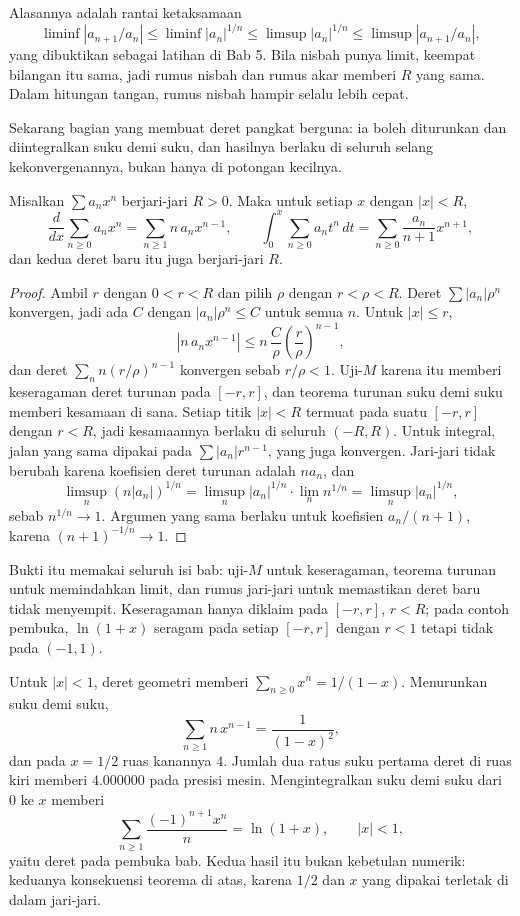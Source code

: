 Alasannya adalah rantai ketaksamaan
\[
  \liminf|a_{n+1}/a_n|\le\liminf|a_n|^{1/n}\le\limsup|a_n|^{1/n}
  \le\limsup|a_{n+1}/a_n|,
\]
yang dibuktikan sebagai latihan di Bab 5. Bila nisbah punya limit, keempat
bilangan itu sama, jadi rumus nisbah dan rumus akar memberi $R$ yang sama. Dalam
hitungan tangan, rumus nisbah hampir selalu lebih cepat.

Sekarang bagian yang membuat deret pangkat berguna: ia boleh diturunkan dan
diintegralkan suku demi suku, dan hasilnya berlaku di seluruh selang
kekonvergenannya, bukan hanya di potongan kecilnya.

\begin{teorema}
Misalkan $\sum a_nx^n$ berjari-jari $R>0$. Maka untuk setiap $x$ dengan
$|x|<R$,
\[
  \frac{d}{dx}\sum_{n\ge0}a_nx^n=\sum_{n\ge1}n\,a_nx^{n-1},
  \qquad
  \int_0^x\sum_{n\ge0}a_nt^n\,dt=\sum_{n\ge0}\frac{a_n}{n+1}x^{n+1},
\]
dan kedua deret baru itu juga berjari-jari $R$.
\end{teorema}

\begin{proof}
Ambil $r$ dengan $0<r<R$ dan pilih $\rho$ dengan $r<\rho<R$. Deret
$\sum|a_n|\rho^n$ konvergen, jadi ada $C$ dengan $|a_n|\rho^n\le C$ untuk semua
$n$. Untuk $|x|\le r$,
\[
  |n\,a_nx^{n-1}|\le n\,\frac{C}{\rho}\left(\frac{r}{\rho}\right)^{n-1},
\]
dan deret $\sum_n n(r/\rho)^{n-1}$ konvergen sebab $r/\rho<1$. Uji-$M$ karena
itu memberi keseragaman deret turunan pada $[-r,r]$, dan teorema turunan suku
demi suku memberi kesamaan di sana. Setiap titik $|x|<R$ termuat pada suatu
$[-r,r]$ dengan $r<R$, jadi kesamaannya berlaku di seluruh $(-R,R)$. Untuk
integral, jalan yang sama dipakai pada $\sum|a_n|r^{n-1}$, yang juga konvergen.
Jari-jari tidak berubah karena koefisien deret turunan adalah $na_n$, dan
\[
  \limsup_n(n|a_n|)^{1/n}
  =\limsup_n|a_n|^{1/n}\cdot\lim_n n^{1/n}
  =\limsup_n|a_n|^{1/n},
\]
sebab $n^{1/n}\to1$. Argumen yang sama berlaku untuk koefisien $a_n/(n+1)$,
karena $(n+1)^{-1/n}\to1$.
\end{proof}

Bukti itu memakai seluruh isi bab: uji-$M$ untuk keseragaman, teorema turunan
untuk memindahkan limit, dan rumus jari-jari untuk memastikan deret baru tidak
menyempit. Keseragaman hanya diklaim pada $[-r,r]$, $r<R$; pada contoh pembuka,
$\ln(1+x)$ seragam pada setiap $[-r,r]$ dengan $r<1$ tetapi tidak pada $(-1,1)$.

\begin{contoh}
Untuk $|x|<1$, deret geometri memberi $\sum_{n\ge0}x^n=1/(1-x)$. Menurunkan
suku demi suku,
\[
  \sum_{n\ge1}n\,x^{n-1}=\frac{1}{(1-x)^2},
\]
dan pada $x=1/2$ ruas kanannya $4$. Jumlah dua ratus suku pertama deret di ruas
kiri memberi $4.000000$ pada presisi mesin. Mengintegralkan suku demi suku dari
$0$ ke $x$ memberi
\[
  \sum_{n\ge1}\frac{(-1)^{n+1}x^n}{n}=\ln(1+x),\qquad |x|<1,
\]
yaitu deret pada pembuka bab. Kedua hasil itu bukan kebetulan numerik: keduanya
konsekuensi teorema di atas, karena $1/2$ dan $x$ yang dipakai terletak di dalam
jari-jari.
\end{contoh}

